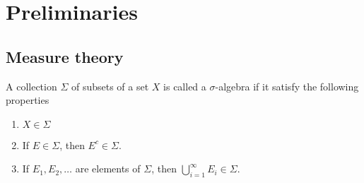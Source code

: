 \chapter{Preliminaries}

  \section{Measure theory}

  \begin{definition}
    \label{def:sigma_algrebra}
    A collection $\Sigma$ of subsets of a set $X$ is called a $\sigma$-algebra if it satisfy the following properties
    \begin{enumerate}
      \item $X\in \Sigma$
      \item If $E \in \Sigma$, then $E^c \in \Sigma$.
    \item If $E_1, E_2, \dots$ are elements of $\Sigma$, then $\bigcup_{i=1}^\infty E_i \in \Sigma$.
    \end{enumerate}
  \end{definition}
